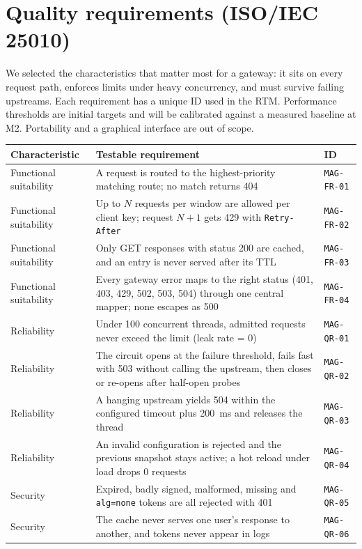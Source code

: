 \documentclass[11pt,a4paper]{article}
\newcommand{\id}[1]{\texttt{#1}}
\begin{document}
\section{Quality requirements (ISO/IEC 25010)}
We selected the characteristics that matter most for a gateway: it sits on every request path, enforces limits under heavy concurrency, and must survive failing upstreams. Each requirement has a unique ID used in the RTM. Performance thresholds are initial targets and will be calibrated against a measured baseline at M2. Portability and a graphical interface are out of scope.

\begin{longtable}{L{3.1cm} L{9.6cm} L{1.8cm}}
\toprule
\textbf{Characteristic} & \textbf{Testable requirement} & \textbf{ID} \\
\midrule
\endhead
Functional suitability & A request is routed to the highest-priority matching route; no match returns 404 & \id{MAG-FR-01} \\
Functional suitability & Up to $N$ requests per window are allowed per client key; request $N{+}1$ gets 429 with \texttt{Retry-After} & \id{MAG-FR-02} \\
Functional suitability & Only GET responses with status 200 are cached, and an entry is never served after its TTL & \id{MAG-FR-03} \\
Functional suitability & Every gateway error maps to the right status (401, 403, 429, 502, 503, 504) through one central mapper; none escapes as 500 & \id{MAG-FR-04} \\
Reliability & Under 100 concurrent threads, admitted requests never exceed the limit (leak rate = 0) & \id{MAG-QR-01} \\
Reliability & The circuit opens at the failure threshold, fails fast with 503 without calling the upstream, then closes or re-opens after half-open probes & \id{MAG-QR-02} \\
Reliability & A hanging upstream yields 504 within the configured timeout plus 200~ms and releases the thread & \id{MAG-QR-03} \\
Reliability & An invalid configuration is rejected and the previous snapshot stays active; a hot reload under load drops 0 requests & \id{MAG-QR-04} \\
Security & Expired, badly signed, malformed, missing and \texttt{alg=none} tokens are all rejected with 401 & \id{MAG-QR-05} \\
Security & The cache never serves one user's response to another, and tokens never appear in logs & \id{MAG-QR-06} \\

\end{longtable}
\end{document}
